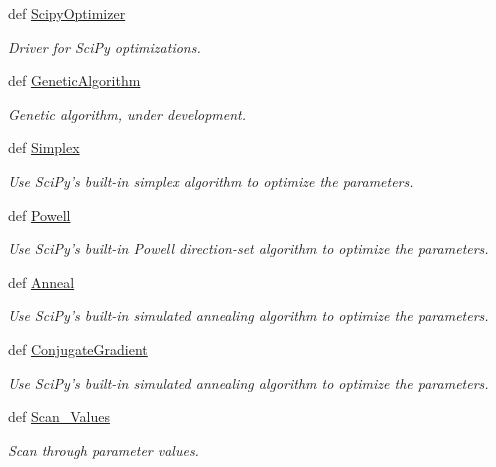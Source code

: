 \begin{DoxyCompactItemize}
def \hyperlink{classforcebalance_1_1optimizer_1_1Optimizer_a503e87533bd9c257cb9c4b505af9c1de}{\-Scipy\-Optimizer}
\begin{DoxyCompactList}\small\item\em \-Driver for \-Sci\-Py optimizations. \end{DoxyCompactList}\item 
def \hyperlink{classforcebalance_1_1optimizer_1_1Optimizer_a50ffc779fbba5a99085cba45d868fc29}{\-Genetic\-Algorithm}
\begin{DoxyCompactList}\small\item\em \-Genetic algorithm, under development. \end{DoxyCompactList}\item 
def \hyperlink{classforcebalance_1_1optimizer_1_1Optimizer_a6b3af8115718f61a6a21c3297d717ead}{\-Simplex}
\begin{DoxyCompactList}\small\item\em \-Use \-Sci\-Py's built-\/in simplex algorithm to optimize the parameters. \end{DoxyCompactList}\item 
def \hyperlink{classforcebalance_1_1optimizer_1_1Optimizer_a0745b2e3607ef308ba48bb1d34e5be79}{\-Powell}
\begin{DoxyCompactList}\small\item\em \-Use \-Sci\-Py's built-\/in \-Powell direction-\/set algorithm to optimize the parameters. \end{DoxyCompactList}\item 
def \hyperlink{classforcebalance_1_1optimizer_1_1Optimizer_a183911848e43ca0be1893b87290dc31e}{\-Anneal}
\begin{DoxyCompactList}\small\item\em \-Use \-Sci\-Py's built-\/in simulated annealing algorithm to optimize the parameters. \end{DoxyCompactList}\item 
def \hyperlink{classforcebalance_1_1optimizer_1_1Optimizer_ad1e151204a172a4e75737b2b699d1623}{\-Conjugate\-Gradient}
\begin{DoxyCompactList}\small\item\em \-Use \-Sci\-Py's built-\/in simulated annealing algorithm to optimize the parameters. \end{DoxyCompactList}\item 
def \hyperlink{classforcebalance_1_1optimizer_1_1Optimizer_a6c7508252398ff7e00469c4c8acb0a48}{\-Scan\-\_\-\-Values}
\begin{DoxyCompactList}\small\item\em \-Scan through parameter values. \end{DoxyCompactList}\item 

\end{DoxyCompactItemize}

